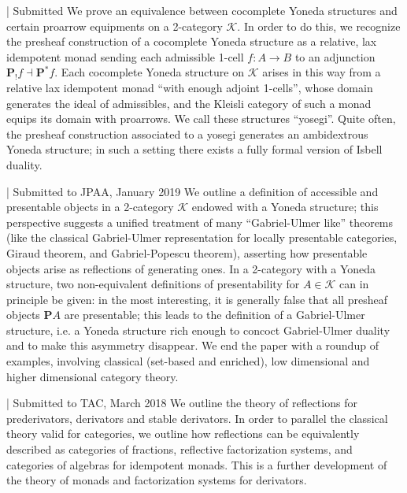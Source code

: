 \begin{eyenumerate}
   \item {}
   { | Submitted }
   {We prove an equivalence between cocomplete Yoneda structures and certain proarrow equipments on a 2-category $\mathcal K$. In order to do this, we recognize the presheaf construction of a cocomplete Yoneda structure as a relative, lax idempotent monad sending each admissible 1-cell $f :A \to B$ to an adjunction $\boldsymbol{P}_!f\dashv\boldsymbol{P}^*f$. Each cocomplete Yoneda structure on $\mathcal K$ arises in this way from a relative lax idempotent monad ``with enough adjoint 1-cells'', whose domain generates the ideal of admissibles, and the Kleisli category of such a monad equips its domain with proarrows. We call these structures ``yosegi''. Quite often, the presheaf construction associated to a yosegi generates an ambidextrous Yoneda structure; in such a setting there exists a fully formal version of Isbell duality.}
   \item {}
   { | Submitted to JPAA, January 2019}
   {We outline a definition of accessible and presentable objects in a 2-category $\mathcal K$ endowed with a Yoneda structure; this perspective suggests a unified treatment of many ``Gabriel-Ulmer like'' theorems (like the classical Gabriel-Ulmer representation for locally presentable categories, Giraud theorem, and Gabriel-Popescu theorem), asserting how presentable objects arise as reflections of generating ones. In a 2-category with a Yoneda structure, two non-equivalent definitions of presentability for $A\in\mathcal K$ can in principle be given: in the most interesting, it is generally false that all presheaf objects $\boldsymbol{P}A$ are presentable; this leads to the definition of a Gabriel-Ulmer structure, i.e. a Yoneda structure rich enough to concoct Gabriel-Ulmer duality and to make this asymmetry disappear. We end the paper with a roundup of examples, involving classical (set-based and enriched), low dimensional and higher dimensional category theory.}
   \item {}
   { | Submitted to TAC, March 2018}
   {We outline the theory of reflections for prederivators, derivators and stable derivators. In order to parallel the classical theory valid for categories, we outline how reflections can be equivalently described as categories of fractions, reflective factorization systems, and categories of algebras for idempotent monads. This is a further development of the theory of monads and factorization systems for derivators.}

\end{eyenumerate}
